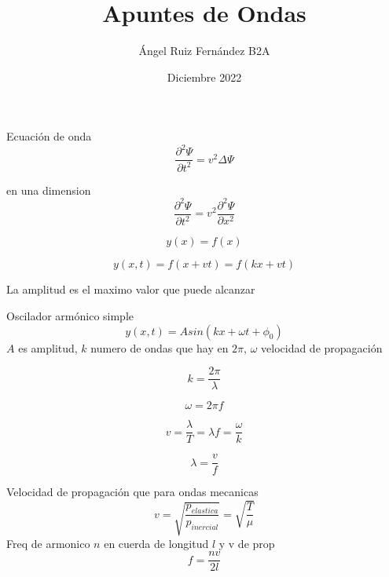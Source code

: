 \documentclass[12pt, letterpaper, twoside]{article}
\title{Apuntes de Ondas}
\author{Ángel Ruiz Fernández B2A}
\date{Diciembre 2022}
\begin{document}
	\maketitle
	
	Ecuación de onda
	\begin{equation}
		\frac{\partial^2 \Psi}{\partial t^2} = v^2 \Delta \Psi
	\end{equation}
	
	en una dimension 
	\begin{equation}
		\frac{\partial^2 \Psi}{\partial t^2} = v^2 \frac{\partial^2 \Psi}{\partial x^2}
	\end{equation}
	
	\begin{equation}
		y(x) = f(x)
	\end{equation}
	
	\begin{equation}
		y(x, t) = f(x + vt) = f(kx + vt)
	\end{equation}

La amplitud es el maximo valor que puede alcanzar

Oscilador armónico simple
	\begin{equation}
		y(x, t) = A sin(kx + \omega t + \phi_0)
	\end{equation}
	$A$ es amplitud, $k$ numero de ondas que hay en $2\pi$, $\omega$ velocidad de propagación
	
	\begin{equation}
		k = \frac{2\pi}{\lambda}
	\end{equation}

	\begin{equation}
		\omega = 2\pi f
	\end{equation}

	\begin{equation}
		v = \frac{\lambda}{T} = \lambda f = \frac{\omega}{k}
	\end{equation}

	\begin{equation}
		\lambda = \frac{v}{f}
	\end{equation}

	Velocidad de propagación que para ondas mecanicas 
	\begin{equation}
		v = \sqrt{\frac{p_{elastica}}{p_{inercial}}} = \sqrt{\frac{T}{\mu}}
	\end{equation}
	Freq de armonico $n$ en cuerda de longitud $l$ y v de prop
	\begin{equation}
		f = \frac{nv}{2l}
	\end{equation}
	
\end{document}
